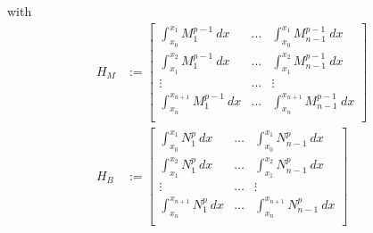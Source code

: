 with
\begin{align}
  H_{M} &:= 
  \begin{bmatrix}
    \int_{x_0}^{x_{1}}M_1^{p-1} ~dx   & \ldots & \int_{x_0}^{x_{1}}M_{n-1}^{p-1} ~dx   \\
    \int_{x_1}^{x_{2}}M_1^{p-1} ~dx   & \ldots & \int_{x_1}^{x_{2}}M_{n-1}^{p-1} ~dx   \\
    \vdots                        & \ldots &                        \vdots \\
    \int_{x_n}^{x_{n+1}}M_1^{p-1} ~dx & \ldots & \int_{x_n}^{x_{n+1}}M_{n-1}^{p-1} ~dx \\
  \end{bmatrix}
  \\
  H_{B} &:= 
  \begin{bmatrix}
    \int_{x_0}^{x_{1}}N_1^p ~dx   & \ldots & \int_{x_0}^{x_{1}}N_{n-1}^p ~dx   \\
    \int_{x_1}^{x_{2}}N_1^p ~dx   & \ldots & \int_{x_1}^{x_{2}}N_{n-1}^p ~dx   \\
    \vdots                        & \ldots &                        \vdots \\
    \int_{x_n}^{x_{n+1}}N_1^p ~dx & \ldots & \int_{x_n}^{x_{n+1}}N_{n-1}^p ~dx \\
  \end{bmatrix}
\end{align}
